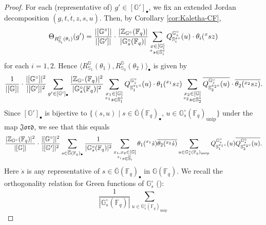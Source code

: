 \documentclass{amsart}
\newcommand{\unip}{\mathrm{unip}}
\newcommand{\Jord}{\mathfrak{Jord}}
\newcommand{\F}{\mathbb{F}}
\newcommand{\bbS}{\mathbb{S}}
\newcommand{\bbG}{\mathbb{G}}
\newcommand{\bbZ}{\mathbb{Z}}
\theoremstyle{plain}
\theoremstyle{definition}
\theoremstyle{remark}
\theoremstyle{theorem}
\begin{document}
\begin{proof}
For each (representative of) $g'\in[\bbG']_{\bullet}$, we fix an extended Jordan decomposition $(g,t,\dot{t},z,s,u)$.
Then, by Corollary \ref{cor:Kaletha-CF}, 
\[
\Theta_{R_{\bbS_i}^{\bbG}(\theta_i)}(g')
=
\frac{|[\bbG^{\circ}]|}{|[\bbG']|}
\cdot\frac{|\bbZ_{\bbG^{\circ}}(\F_{q})|}{|\bbG^{\circ}_{s}(\F_{q})|}
\sum_{\begin{subarray}{c}x\in [\bbG] \\ {}^{x}s\in\bbS_{i}^{\circ}\end{subarray}}
Q^{\bbG^{\circ}_{s}}_{\bbS_{i}^{x\circ}}(u)\cdot \theta_{i}({}^{x}sz)
\]
for each $i=1,2$.
Hence $\langle R_{\bbS_1}^{\bbG}(\theta_1),R_{\bbS_2}^{\bbG}(\theta_2)\rangle_{\bullet}$ is given by
\[
\frac{1}{|[\bbG]|}
\cdot\frac{|[\bbG^{\circ}]|^{2}}{|[\bbG']|^{2}}
\sum_{g'\in[\bbG']_{\bullet}}
\frac{|\bbZ_{\bbG^{\circ}}(\F_{q})|^{2}}{|\bbG_{s}^{\circ}(\F_{q})|^{2}}
\sum_{\begin{subarray}{c}x_{1}\in [\bbG] \\ {}^{x_{1}}s\in\bbS_{1}^{\circ}\end{subarray}}
Q^{\bbG^{\circ}_{s}}_{\bbS_{1}^{x_{1}\circ}}(u)\cdot \theta_{1}({}^{x_{1}}sz)
\sum_{\begin{subarray}{c}x_{2}\in [\bbG] \\ {}^{x_{2}}s\in\bbS_{2}^{\circ}\end{subarray}}
\overline{Q^{\bbG^{\circ}_{s}}_{\bbS_{2}^{x_{2}\circ}}(u)}\cdot\overline{\theta_{2}({}^{x_{2}}sz)}.
\]
Since $[\bbG']_{\bullet}$ is bijective to $\{(s,u)\mid s\in\overline{\bbG}(\F_{q})_{\bullet},\, u\in\bbG^{\circ}_{s}(\F_{q})_{\unip}\}$ under the map $\Jord$, we see that this equals
\[
\frac{|\bbZ_{\bbG^{\circ}}(\F_{q})|^{2}}{|[\bbG]|}
\cdot\frac{|[\bbG^{\circ}]|^{2}}{|[\bbG']|^{2}}
\sum_{s\in\overline{\bbG}(\F_{q})_{\bullet}}
\frac{1}{|\bbG_{s}^{\circ}(\F_{q})|^{2}}
\sum_{\begin{subarray}{c}x_{1},x_{2}\in[\bbG]\\ {}^{x_{i}}s\in\overline{\bbS}_{i}\end{subarray}}
\theta_{1}({}^{x_{1}}\dot{s})\overline{\theta_{2}({}^{x_{2}}\dot{s})}
\sum_{u\in\bbG_{s}^{\circ}(\F_{q})_{\unip}}
Q_{\bbS_{1}^{x_{1}\circ}}^{\bbG_{s}^{\circ}}(u)\overline{Q_{\bbS_{2}^{x_{2}\circ}}^{\bbG_{s}^{\circ}}(u)}.
\]
Here $\dot{s}$ is any representative of $s\in\overline{\bbG}(\F_{q})_{\bullet}$ in $\bbG(\F_{q})$.
We recall the orthogonality relation for Green functions of $\bbG_{s}^{\circ}$ (\cite[Theorem 6.9]{DL76}):
\[
\frac{1}{|\bbG_{s}^{\circ}(\F_{q})|}
\sum_{u\in\bbG_{s}^{\circ}(\F_{q})_{\unip}}
\]
\end{proof}
\end{document}
